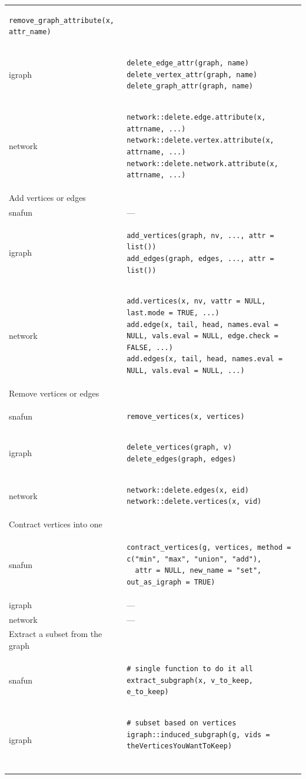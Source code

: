 \documentclass[
]{article}
\begin{document}
\begin{longtable}{ll}
\begin{verbatim}
remove_graph_attribute(x, attr_name)
\end{verbatim} \\ 
igraph & \begin{verbatim}
delete_edge_attr(graph, name)
delete_vertex_attr(graph, name)
delete_graph_attr(graph, name)
\end{verbatim} \\ 
network & \begin{verbatim}
network::delete.edge.attribute(x, attrname, ...)
network::delete.vertex.attribute(x, attrname, ...)
network::delete.network.attribute(x, attrname, ...)
\end{verbatim} \\ 
\midrule
\multicolumn{1}{l}{Add vertices or edges} \\ 
\midrule
snafun & — \\ 
igraph & \begin{verbatim}
add_vertices(graph, nv, ..., attr = list())
add_edges(graph, edges, ..., attr = list())
\end{verbatim} \\ 
network & \begin{verbatim}
add.vertices(x, nv, vattr = NULL, last.mode = TRUE, ...)
add.edge(x, tail, head, names.eval = NULL, vals.eval = NULL, edge.check = FALSE, ...)
add.edges(x, tail, head, names.eval = NULL, vals.eval = NULL, ...)
\end{verbatim} \\ 
\midrule
\multicolumn{1}{l}{Remove vertices or edges} \\ 
\midrule
snafun & \begin{verbatim}
remove_vertices(x, vertices)
\end{verbatim} \\ 
igraph & \begin{verbatim}
delete_vertices(graph, v)
delete_edges(graph, edges)
\end{verbatim} \\ 
network & \begin{verbatim}
network::delete.edges(x, eid)
network::delete.vertices(x, vid)
\end{verbatim} \\ 
\midrule
\multicolumn{1}{l}{Contract vertices into one} \\ 
\midrule
snafun & \begin{verbatim}
contract_vertices(g, vertices, method = c("min", "max", "union", "add"),
  attr = NULL, new_name = "set", out_as_igraph = TRUE)
\end{verbatim} \\ 
igraph & — \\ 
network & — \\ 
\midrule
\multicolumn{1}{l}{Extract a subset from the graph} \\ 
\midrule
snafun & \begin{verbatim}
# single function to do it all
extract_subgraph(x, v_to_keep, e_to_keep)
\end{verbatim} \\ 
igraph & \begin{verbatim}
# subset based on vertices
igraph::induced_subgraph(g, vids = theVerticesYouWantToKeep)


\end{verbatim}
\end{longtable}
\end{document}
